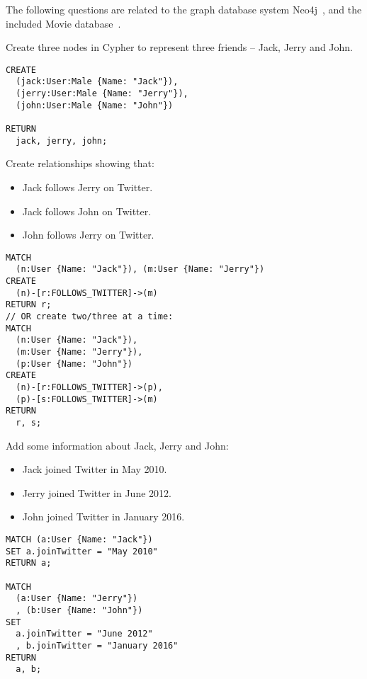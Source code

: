 \documentclass[a4paper, 12pt]{exam}
\begin{document}
\noindent
The following questions are related to the graph database system Neo4j~\cite{neo4j}, and the included Movie database~\cite{moviedb}.

\begin{questions}

\question
Create three nodes in Cypher to represent three friends -- Jack, Jerry and John.
\begin{solution}
  \begin{verbatim}
CREATE
  (jack:User:Male {Name: "Jack"}), 
  (jerry:User:Male {Name: "Jerry"}),
  (john:User:Male {Name: "John"})

RETURN
  jack, jerry, john;
  \end{verbatim}
\end{solution}
  
\question
Create relationships showing that:

\begin{itemize}
  \item Jack follows Jerry on Twitter.
  \item Jack follows John on Twitter.
  \item John follows Jerry on Twitter.
\end{itemize}

\begin{solution}
  \begin{verbatim}
MATCH
  (n:User {Name: "Jack"}), (m:User {Name: "Jerry"})
CREATE
  (n)-[r:FOLLOWS_TWITTER]->(m)
RETURN r;
// OR create two/three at a time:
MATCH 
  (n:User {Name: "Jack"}),
  (m:User {Name: "Jerry"}),
  (p:User {Name: "John"})
CREATE
  (n)-[r:FOLLOWS_TWITTER]->(p),
  (p)-[s:FOLLOWS_TWITTER]->(m)
RETURN
  r, s;
  \end{verbatim}
\end{solution}

\question
Add some information about Jack, Jerry and John:
\begin{itemize}
  \item Jack joined Twitter in May 2010.
  \item Jerry joined Twitter in June 2012.
  \item John joined Twitter in January 2016.
\end{itemize}

\begin{solution}
\begin{verbatim}
MATCH (a:User {Name: "Jack"})
SET a.joinTwitter = "May 2010"
RETURN a;

MATCH
  (a:User {Name: "Jerry"})
  , (b:User {Name: "John"})
SET
  a.joinTwitter = "June 2012"
  , b.joinTwitter = "January 2016"
RETURN
  a, b;
  \end{verbatim}
\end{solution}


\end{questions}
\end{document}
